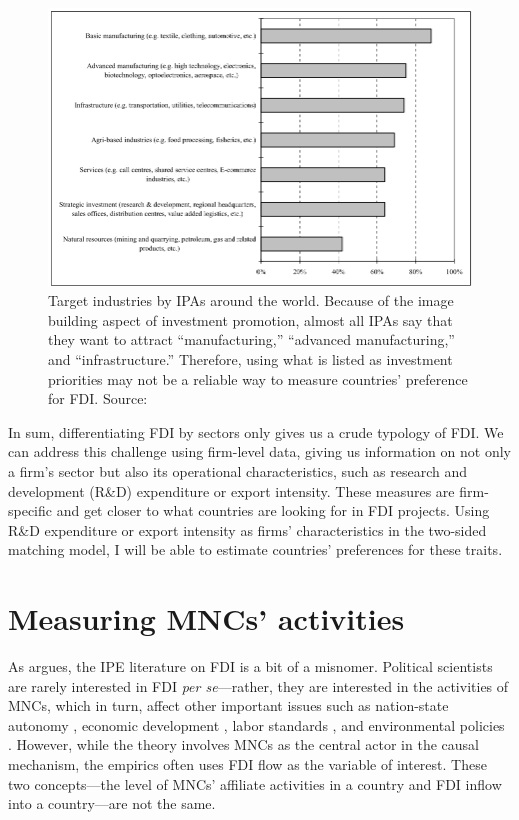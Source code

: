 \begin{figure}[tbp] \centering
  \includegraphics[width=\textwidth,keepaspectratio]{../figure/IPA_target_industries}
  \caption[Target industries by IPAs around the world.]{Target industries by IPAs
    around the world. Because of the image building aspect of investment
    promotion, almost all IPAs say that they want to attract ``manufacturing,''
    ``advanced manufacturing,'' and ``infrastructure.'' Therefore, using what is
    listed as investment priorities may not be a reliable way to measure
    countries' preference for FDI. Source: \citet{UNCTAD2001}}
  \label{fig:IPA_target_industries}
\end{figure}

In sum, differentiating FDI by sectors only gives us a crude typology of FDI. We
can address this challenge using firm-level data, giving us information on not
only a firm's sector but also its operational characteristics, such as research
and development (R\&D) expenditure or export intensity. These measures are
firm-specific and get closer to what countries are looking for in FDI projects.
Using R\&D expenditure or export intensity as firms' characteristics in the
two-sided matching model, I will be able to estimate countries' preferences for
these traits.

\section{Measuring MNCs' activities}

As \citet{Kerner2014} argues, the IPE literature on FDI is a bit of a misnomer.
Political scientists are rarely interested in FDI \textit{per se}---rather, they
are interested in the activities of MNCs, which in turn, affect other important
issues such as nation-state autonomy \citep{Mosley2005}, economic development
\citep{Moran1998}, labor standards \citep{Mosley2007}, and environmental
policies \citep{Prakash2007}. However, while the theory involves MNCs as the
central actor in the causal mechanism, the empirics often uses FDI flow as the
variable of interest. These two concepts---the level of MNCs' affiliate
activities in a country and FDI inflow into a country---are not the same.


